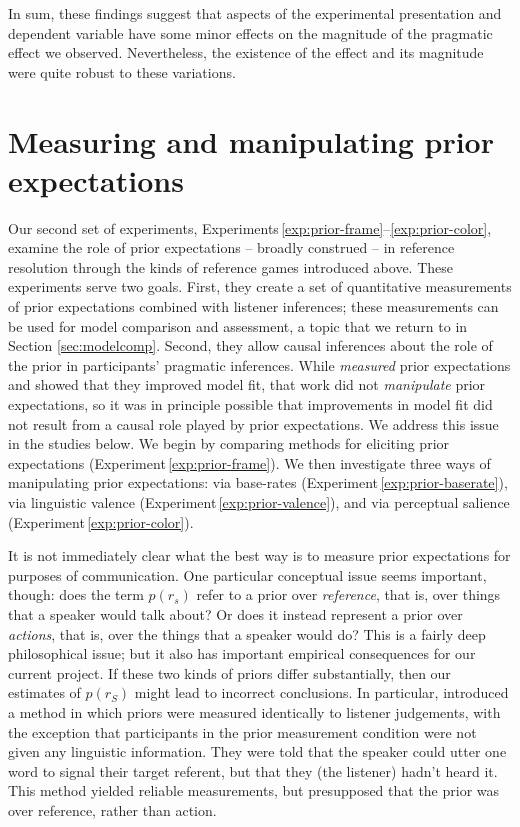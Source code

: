 \documentclass[man,noapacite]{apa2}
\newcounter{Experiment}
\newcommand{\exptref}[1]{Experiment\,\ref{#1}}
\newcommand{\exptrefrange}[2]{Experiments\,\ref{#1}--\ref{#2}}
\begin{document}
In sum, these findings suggest that aspects of the experimental presentation and dependent variable have some minor effects on the magnitude of the pragmatic effect we observed. Nevertheless, the existence of the effect and its magnitude were quite robust to these variations.

\section{Measuring and manipulating prior expectations}
\label{sec:prior}

Our second set of experiments, \exptrefrange{exp:prior-frame}{exp:prior-color}, examine the role of prior expectations -- broadly construed -- in reference resolution through the kinds of reference games introduced above. These experiments serve two goals. First, they create a set of quantitative measurements of prior expectations combined with listener inferences; these measurements can be used for model comparison and assessment, a topic that we return to in Section \ref{sec:modelcomp}. Second, they allow causal inferences about the role of the prior in participants' pragmatic inferences. While  \emph{measured} prior expectations and showed that they improved model fit, that work did not \emph{manipulate} prior expectations, so it was in principle possible that improvements in model fit did not result from a causal role played by prior expectations. We address this issue in the studies below. We begin by comparing methods for eliciting prior expectations (\exptref{exp:prior-frame}). We then investigate three ways of manipulating prior expectations: via base-rates (\exptref{exp:prior-baserate}), via linguistic valence (\exptref{exp:prior-valence}), and via perceptual salience (\exptref{exp:prior-color}).

It is not immediately clear what the best way is to measure prior expectations for purposes of communication. One particular conceptual issue seems important, though: does the term $p(r_s)$ refer to a prior over \emph{reference}, that is, over things that a speaker would talk about? Or does it instead represent a prior over \emph{actions}, that is, over the things that a speaker would do? This is a fairly deep philosophical issue; but it also has important empirical consequences for our current project. If these two kinds of priors differ substantially, then our estimates of $p(r_S)$ might lead to incorrect conclusions. In particular,  introduced a method in which priors were measured identically to listener judgements, with the exception that participants in the prior measurement condition were not given any linguistic information. They were told that the speaker could utter one word to signal their target referent, but that they (the listener) hadn't heard it. This method yielded reliable measurements, but presupposed that the prior was over reference, rather than action.
\end{document}
